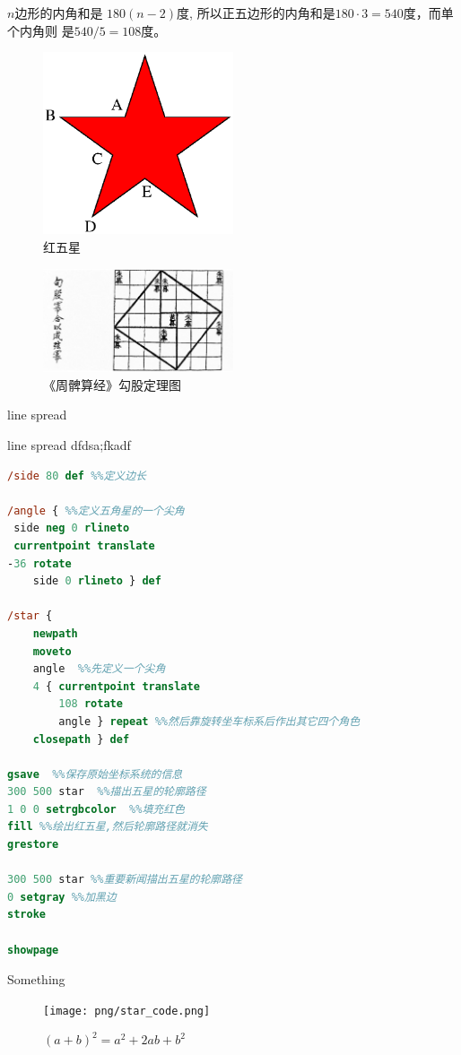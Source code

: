 \documentclass[main.tex]{subfiles}
\begin{document}
\begin{example} $n$边形的内角和是 $180(n-2)$度, 所以正五边形的内角和是$180\cdot 3 = 540$度，而单个内角则 是$540/5 = 108$度。
\end{example}

\begin{figure}[h]
	\centering
	\includegraphics[width=0.5\textwidth]{images/star.eps}
	\caption{红五星}
	\label{fig:III.1.2}
\end{figure}

\begin{figure}[h]
	\centering
	\includegraphics[width=0.5\textwidth]{images/ps/ch_gougu.jpg}
	\caption{《周髀算经》勾股定理图}
	\label{fig:III.1.3}
\end{figure}

line spread

line spread
dfdsa;fkadf

\begin{spacing}{0.8}
\begin{lstlisting}[language=PostScript]
%!PS-Adobe-3.0
/side 80 def %%定义边长 

/angle { %%定义五角星的一个尖角   
 side neg 0 rlineto
 currentpoint translate
-36 rotate
	side 0 rlineto } def

/star {
	newpath
	moveto
	angle  %%先定义一个尖角
	4 { currentpoint translate
		108 rotate
		angle } repeat %%然后靠旋转坐车标系后作出其它四个角色
	closepath } def

gsave  %%保存原始坐标系统的信息
300 500 star  %%描出五星的轮廓路径
1 0 0 setrgbcolor  %%填充红色
fill %%绘出红五星,然后轮廓路径就消失
grestore

300 500 star %%重要新闻描出五星的轮廓路径
0 setgray %%加黑边
stroke

showpage
\end{lstlisting}
\end{spacing}



Something
\begin{figure}[h]
	\centering
	\texttt{[image: png/star\_code.png]}
	\caption{$(a+b)^2 = a^2 + 2ab + b^2$}
	\label{fig:III.1.3}
\end{figure}
\end{document}
